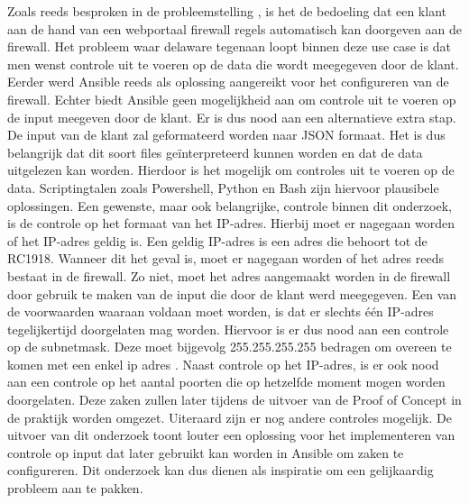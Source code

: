 Zoals reeds besproken in de probleemstelling , is het de bedoeling dat een klant aan de hand van een webportaal firewall regels automatisch kan doorgeven aan de firewall. Het probleem waar delaware tegenaan loopt binnen deze use case is dat men wenst controle uit te voeren op de data die wordt meegegeven door de klant. Eerder werd Ansible reeds als oplossing aangereikt voor het configureren van de firewall. Echter biedt Ansible geen mogelijkheid aan om controle uit te voeren op de input meegeven door de klant. Er is dus nood aan een alternatieve extra stap. De input van de klant zal geformateerd worden naar JSON formaat. Het is dus belangrijk dat dit soort files geïnterpreteerd kunnen worden en dat de data uitgelezen kan worden. Hierdoor is het mogelijk om controles uit te voeren op de data. Scriptingtalen zoals Powershell, Python en Bash zijn hiervoor plausibele oplossingen. %
 Een gewenste, maar ook belangrijke, controle binnen dit onderzoek, is de controle op het formaat van het IP-adres. Hierbij moet er nagegaan worden of het IP-adres geldig is. Een geldig IP-adres is een adres die behoort tot de RC1918. 
 Wanneer dit het geval is, moet er nagegaan worden of het adres reeds bestaat in de firewall. Zo niet, moet het adres aangemaakt worden in de firewall door gebruik te maken van de input die door de klant werd meegegeven. Een van de voorwaarden waaraan voldaan moet worden, is dat er slechts één IP-adres tegelijkertijd doorgelaten mag worden. Hiervoor is er dus nood aan een controle op de subnetmask. Deze moet bijgevolg 255.255.255.255 bedragen om overeen te komen met een enkel ip adres \autocite{StackExchange2020}. Naast controle op het IP-adres, is er ook nood aan een controle op het aantal poorten die op hetzelfde moment mogen worden doorgelaten.  Deze zaken zullen later tijdens de uitvoer van de Proof of Concept in de praktijk worden omgezet. Uiteraard zijn er nog andere controles mogelijk. De uitvoer van dit onderzoek toont louter een oplossing voor het implementeren van controle op input dat later gebruikt kan worden in Ansible om zaken te configureren. Dit onderzoek kan dus dienen als inspiratie om een gelijkaardig probleem aan te pakken. 



